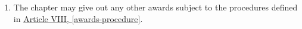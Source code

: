 \begin{enumerate}
		\item The chapter may give out any other awards subject to the procedures defined in \hyperref[awards-procedure]{Article VIII, \autoref*{awards-procedure}}.

	\end{enumerate}




